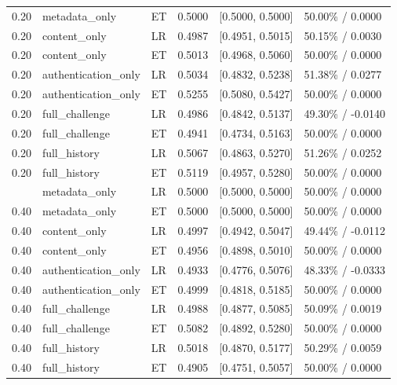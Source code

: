 \documentclass[journal]{IEEEtran}
\theoremstyle{definition}
\theoremstyle{game}
\begin{document}
\begin{table}[p]
\begin{tabular}{@{}lllccl@{}}
0.20 & metadata\_only & ET & 0.5000 & [0.5000, 0.5000] & 50.00\% / 0.0000\\
0.20 & content\_only & LR & 0.4987 & [0.4951, 0.5015] & 50.15\% / 0.0030\\
0.20 & content\_only & ET & 0.5013 & [0.4968, 0.5060] & 50.00\% / 0.0000\\
0.20 & authentication\_only & LR & 0.5034 & [0.4832, 0.5238] & 51.38\% / 0.0277\\
0.20 & authentication\_only & ET & 0.5255 & [0.5080, 0.5427] & 50.00\% / 0.0000\\
0.20 & full\_challenge & LR & 0.4986 & [0.4842, 0.5137] & 49.30\% / -0.0140\\
0.20 & full\_challenge & ET & 0.4941 & [0.4734, 0.5163] & 50.00\% / 0.0000\\
0.20 & full\_history & LR & 0.5067 & [0.4863, 0.5270] & 51.26\% / 0.0252\\
0.20 & full\_history & ET & 0.5119 & [0.4957, 0.5280] & 50.00\% / 0.0000\\
\addlinespace[4pt]
0.40 & metadata\_only & LR & 0.5000 & [0.5000, 0.5000] & 50.00\% / 0.0000\\
0.40 & metadata\_only & ET & 0.5000 & [0.5000, 0.5000] & 50.00\% / 0.0000\\
0.40 & content\_only & LR & 0.4997 & [0.4942, 0.5047] & 49.44\% / -0.0112\\
0.40 & content\_only & ET & 0.4956 & [0.4898, 0.5010] & 50.00\% / 0.0000\\
0.40 & authentication\_only & LR & 0.4933 & [0.4776, 0.5076] & 48.33\% / -0.0333\\
0.40 & authentication\_only & ET & 0.4999 & [0.4818, 0.5185] & 50.00\% / 0.0000\\
0.40 & full\_challenge & LR & 0.4988 & [0.4877, 0.5085] & 50.09\% / 0.0019\\
0.40 & full\_challenge & ET & 0.5082 & [0.4892, 0.5280] & 50.00\% / 0.0000\\
0.40 & full\_history & LR & 0.5018 & [0.4870, 0.5177] & 50.29\% / 0.0059\\
0.40 & full\_history & ET & 0.4905 & [0.4751, 0.5057] & 50.00\% / 0.0000\\
\bottomrule
\end{tabular}
\end{table}
\clearpage
\end{document}
